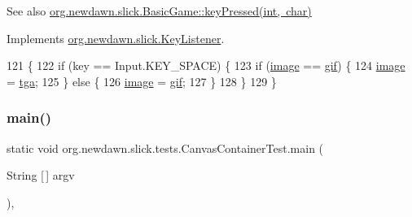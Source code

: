 \begin{DoxySeeAlso}{See also}
\mbox{\hyperlink{classorg_1_1newdawn_1_1slick_1_1_basic_game_a4fbb3345b5abf5ddd54a99466d07f02f}{org.\+newdawn.\+slick.\+Basic\+Game\+::key\+Pressed(int, char)}} 
\end{DoxySeeAlso}


Implements \mbox{\hyperlink{interfaceorg_1_1newdawn_1_1slick_1_1_key_listener_ac0b0568a21ef486c4f51382614c196ef}{org.\+newdawn.\+slick.\+Key\+Listener}}.


\begin{DoxyCode}
121                                             \{
122         \textcolor{keywordflow}{if} (key == Input.KEY\_SPACE) \{
123             \textcolor{keywordflow}{if} (\mbox{\hyperlink{classorg_1_1newdawn_1_1slick_1_1tests_1_1_canvas_container_test_ab4b36d2c86487188a6813d9ea094ea78}{image}} == \mbox{\hyperlink{classorg_1_1newdawn_1_1slick_1_1tests_1_1_canvas_container_test_a71f9f7b72559e875d884ee0464bfafef}{gif}}) \{
124                 \mbox{\hyperlink{classorg_1_1newdawn_1_1slick_1_1tests_1_1_canvas_container_test_ab4b36d2c86487188a6813d9ea094ea78}{image}} = \mbox{\hyperlink{classorg_1_1newdawn_1_1slick_1_1tests_1_1_canvas_container_test_ae2f4c29119e720e355fa9c7f48ded3f8}{tga}};
125             \} \textcolor{keywordflow}{else} \{
126                 \mbox{\hyperlink{classorg_1_1newdawn_1_1slick_1_1tests_1_1_canvas_container_test_ab4b36d2c86487188a6813d9ea094ea78}{image}} = \mbox{\hyperlink{classorg_1_1newdawn_1_1slick_1_1tests_1_1_canvas_container_test_a71f9f7b72559e875d884ee0464bfafef}{gif}};
127             \}
128         \}
129     \}
\end{DoxyCode}
\mbox{\label{classorg_1_1newdawn_1_1slick_1_1tests_1_1_canvas_container_test_aaadfc68daa8826aaedb71d829018bfdb}} 
\subsubsection{\texorpdfstring{main()}{main()}}
{\footnotesize\ttfamily static void org.\+newdawn.\+slick.\+tests.\+Canvas\+Container\+Test.\+main (\begin{DoxyParamCaption}\item[{String \mbox{[}$\,$\mbox{]}}]{argv }\end{DoxyParamCaption})\hspace{0.3cm}{\ttfamily [inline]}, {\ttfamily [static]}}

